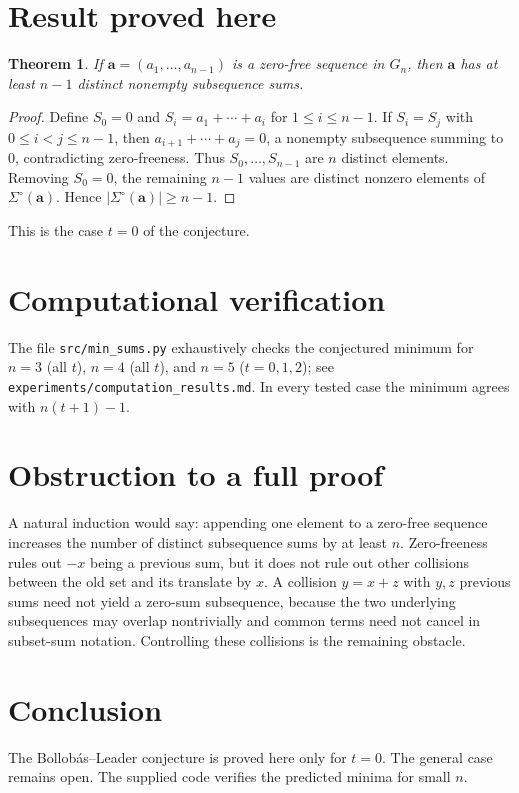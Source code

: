 \documentclass[11pt]{article}
\newtheorem{theorem}{Theorem}
\begin{document}
\section{Result proved here}

\begin{theorem}
If $\mathbf a=(a_1,\dots,a_{n-1})$ is a zero-free sequence in $G_n$, then
$\mathbf a$ has at least $n-1$ distinct nonempty subsequence sums.
\end{theorem}

\begin{proof}
Define $S_0=0$ and $S_i=a_1+\cdots+a_i$ for $1\le i\le n-1$.  If
$S_i=S_j$ with $0\le i<j\le n-1$, then
$a_{i+1}+\cdots+a_j=0$, a nonempty subsequence summing to $0$,
contradicting zero-freeness.  Thus $S_0,\dots,S_{n-1}$ are $n$ distinct
elements.  Removing $S_0=0$, the remaining $n-1$ values are distinct
nonzero elements of $\Sigma^\circ(\mathbf a)$.  Hence
$|\Sigma^\circ(\mathbf a)|\ge n-1$.
\end{proof}

This is the case $t=0$ of the conjecture.

\section{Computational verification}

The file \texttt{src/min\_sums.py} exhaustively checks the conjectured
minimum for $n=3$ (all $t$), $n=4$ (all $t$), and $n=5$ ($t=0,1,2$);
see \texttt{experiments/computation\_results.md}.  In every tested
case the minimum agrees with $n(t+1)-1$.

\section{Obstruction to a full proof}

A natural induction would say: appending one element to a zero-free
sequence increases the number of distinct subsequence sums by at least $n$.
Zero-freeness rules out $-x$ being a previous sum, but it does not rule
out other collisions between the old set and its translate by $x$.  A
collision $y=x+z$ with $y,z$ previous sums need not yield a zero-sum
subsequence, because the two underlying subsequences may overlap
nontrivially and common terms need not cancel in subset-sum notation.
Controlling these collisions is the remaining obstacle.

\section{Conclusion}

The Bollob\'as--Leader conjecture is proved here only for $t=0$.  The
general case remains open.  The supplied code verifies the predicted
minima for small $n$.
\end{document}
